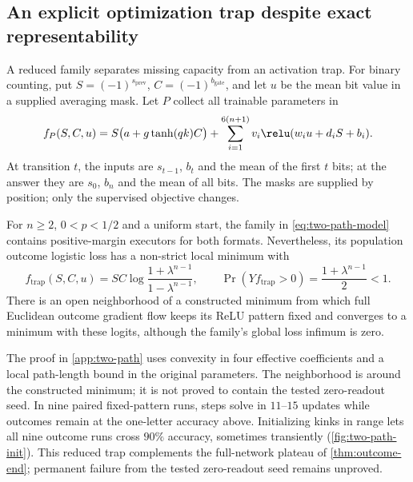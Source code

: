 \subsection{An explicit optimization trap despite exact representability}
\label{sec:two-path-trap}
A reduced family separates missing capacity from an activation trap. For binary
counting, put $S=(-1)^{s_{\mathrm{prev}}}$, $C=(-1)^{b_{\mathrm{gate}}}$,
and let $u$ be the mean bit value in a supplied averaging mask. Let $P$ collect all trainable parameters in
\begin{equation}
 f_P(S,C,u)=S\bigl(a+g\tanh(qk)C\bigr)
 +\sum_{i=1}^{6(n+1)}v_i\relu(w_i u+d_iS+b_i).
 \label{eq:two-path-model}
\end{equation}
At transition $t$, the inputs are $s_{t-1}$, $b_t$ and the mean of the first
$t$ bits; at the answer they are $s_0$, $b_n$ and the mean of all bits.
The masks are supplied by position; only the supervised objective changes.

\begin{proposition}
\label{prop:two-path-trap}
For $n\ge2$, $0<p<1/2$ and a uniform start, the family in
\cref{eq:two-path-model} contains positive-margin executors for both formats.
Nevertheless, its population outcome logistic loss has a non-strict local minimum
with
\[
 f_{\mathrm{trap}}(S,C,u)=S C\log\frac{1+\lambda^{n-1}}{1-\lambda^{n-1}},
 \qquad \Pr(Yf_{\mathrm{trap}}>0)=\frac{1+\lambda^{n-1}}2<1.
\]
There is an open neighborhood of a constructed minimum from which full
Euclidean outcome gradient flow keeps its ReLU pattern fixed and converges
to a minimum with these logits, although the family's global loss infimum is zero.
\end{proposition}
The proof in \cref{app:two-path} uses convexity in four effective coefficients
and a local path-length bound in the original parameters. The neighborhood is
around the constructed minimum; it is not proved to contain the tested zero-readout
seed. In nine paired fixed-pattern runs, steps solve in $11$--$15$ updates while
outcomes remain at the one-letter accuracy above. Initializing kinks in range
lets all nine outcome runs cross $90\%$ accuracy, sometimes transiently
(\cref{fig:two-path-init}). This reduced trap complements the full-network plateau
of \cref{thm:outcome-end}; permanent failure from the tested zero-readout seed remains unproved.

